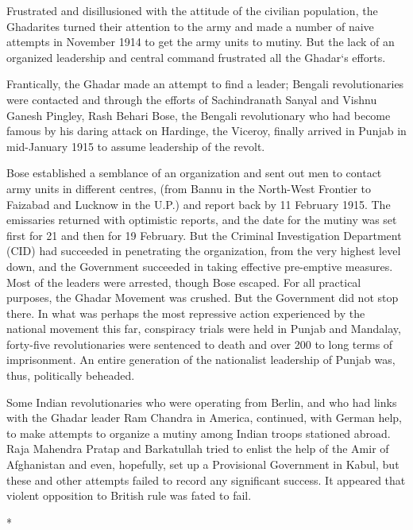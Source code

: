 Frustrated and disillusioned with the attitude of the civilian population, the Ghadarites turned their attention to the army and made a number of naive attempts in November 1914 to get the army units to mutiny. But the lack of an organized leadership and central command frustrated all the Ghadar`s efforts.

Frantically, the Ghadar made an attempt to find a leader; Bengali revolutionaries were contacted and through the efforts of Sachindranath Sanyal and Vishnu Ganesh Pingley, Rash Behari Bose, the Bengali revolutionary who had become famous by his daring attack on Hardinge, the Viceroy, finally arrived in Punjab in mid-January 1915 to assume leadership of the revolt.

Bose established a semblance of an organization and sent out men to contact army units in different centres, (from Bannu in the North-West Frontier to Faizabad and Lucknow in the U.P.) and report back by 11 February 1915. The emissaries returned with optimistic reports, and the date for the mutiny was set first for 21 and then for 19 February. But the Criminal Investigation Department (CID) had succeeded in penetrating the organization, from the very highest level down, and the Government succeeded in taking effective pre-emptive measures. Most of the leaders were arrested, though Bose escaped. For all practical purposes, the Ghadar Movement was crushed. But the Government did not stop there. In what was perhaps the most repressive action experienced by the national movement this far, conspiracy trials were held in Punjab and Mandalay, forty-five revolutionaries were sentenced to death and over 200 to long terms of imprisonment. An entire generation of the nationalist leadership of Punjab was, thus, politically beheaded.

Some Indian revolutionaries who were operating from Berlin, and who had links with the Ghadar leader Ram Chandra in America, continued, with German help, to make attempts to organize a mutiny among Indian troops stationed abroad. Raja Mahendra Pratap and Barkatullah tried to enlist the help of the Amir of Afghanistan and even, hopefully, set up a Provisional Government in Kabul, but these and other attempts failed to record any significant success. It appeared that violent opposition to British rule was fated to fail.

\begin{center}*\end{center}

\paragraph*{}


